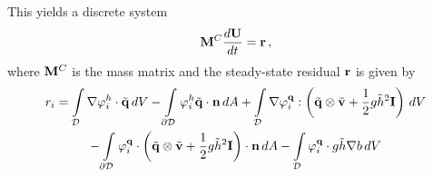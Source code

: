 This yields a discrete system
\begin{equation}
  \mathbf{M}^C\frac{d\mathbf{U}}{dt} = \mathbf{r} \,,
\end{equation}
where $\mathbf{M}^C$ is the mass matrix and the steady-state residual
$\mathbf{r}$ is given by
\begin{multline}
  r_i =
  \int\limits_{\mathcal{D}} \nabla\varphi_i^h\cdot\tilde{\mathbf{q}} \,dV
  - \int\limits_{\partial\mathcal{D}} \varphi_i^h\tilde{\mathbf{q}}\cdot\mathbf{n} \,dA
  + \int\limits_{\mathcal{D}} \nabla\varphi_i^{\mathbf{q}}:
    \left(\tilde{\mathbf{q}}\otimes\tilde{\mathbf{v}}
    + \frac{1}{2}g\tilde{h}^2\mathbf{I}\right) \,dV
  \\
  - \int\limits_{\partial\mathcal{D}} \varphi_i^{\mathbf{q}}\cdot
    \left(\tilde{\mathbf{q}}\otimes\tilde{\mathbf{v}}
    + \frac{1}{2}g \tilde{h}^2\mathbf{I}\right)\cdot\mathbf{n} \,dA
  - \int\limits_{\mathcal{D}} \varphi_i^{\mathbf{q}}\cdot
    g\tilde{h}\nabla b \,dV
\end{multline}
